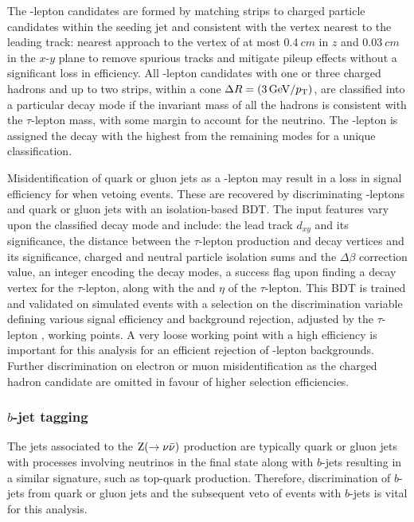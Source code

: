The \Ptauh-lepton candidates are formed by matching strips to charged particle
candidates within the seeding jet and consistent with the vertex nearest to
the leading track: nearest approach to the vertex of at most $\SI{0.4}{cm}$ in
$z$ and $\SI{0.03}{cm}$ in the $x$-$y$ plane to remove spurious tracks and
mitigate pileup effects without a significant loss in efficiency. All
\Ptauh-lepton candidates with one or three charged hadrons and up to two
strips, within a cone $\Delta R=(\SI{3}{GeV}/p_{\text{T}})$, are classified into a
particular decay mode if the invariant mass of all the hadrons is consistent
with the $\tau$-lepton mass, with some margin to account for the neutrino. The
\Ptauh-lepton is assigned the decay with the highest \pt from the remaining
modes for a unique classification.

Misidentification of quark or gluon jets as a \Ptauh-lepton may result in a
loss in signal efficiency for \IZvvj when vetoing \Ptauh events. These are
recovered by discriminating \Ptauh-leptons and quark or gluon jets with an
isolation-based BDT. The input features vary upon the classified decay mode
and include: the lead track $d_{xy}$ and its significance, the distance
between the $\tau$-lepton production and decay vertices and its significance,
charged and neutral particle isolation sums and the $\Delta\beta$ correction
value, an integer encoding the decay modes, a success flag upon finding a
decay vertex for the $\tau$-lepton, along with the \pt and $\eta$ of the
$\tau$-lepton. This BDT is trained and validated on simulated events with a
selection on the discrimination variable defining various signal efficiency
and background rejection, adjusted by the $\tau$-lepton \pt, working points. A
very loose working point with a high efficiency is important for this analysis
for an efficient rejection of \Ptauh-lepton backgrounds. Further
discrimination on electron or muon misidentification as the charged hadron
candidate are omitted in favour of higher selection efficiencies.

\subsubsection{$b$-jet tagging}

The jets associated to the ${\mathrm{Z}(\rightarrow\nu\bar{\nu})}$ production are typically quark or gluon jets with processes involving neutrinos in the final state along with $b$-jets resulting in a similar signature, such as top-quark production. Therefore, discrimination of $b$-jets from quark or gluon jets and the subsequent veto of events with $b$-jets is vital for this analysis.

